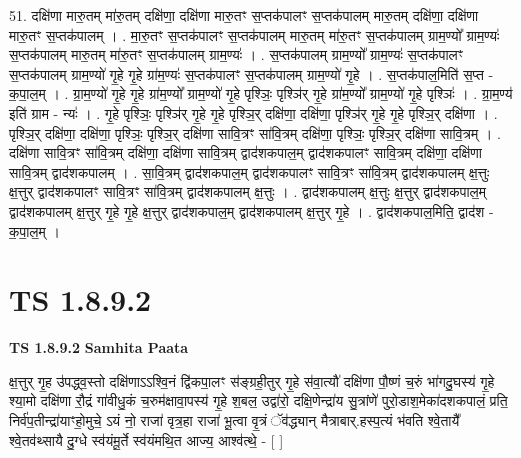\documentclass[17pt]{extarticle}
\begin{document}
51. दक्षि॑णा मारु॒तम् मा॑रु॒तम् दक्षि॑णा॒ दक्षि॑णा मारु॒तꣳ स॒प्तक॑पालꣳ स॒प्तक॑पालम् मारु॒तम् दक्षि॑णा॒ दक्षि॑णा मारु॒तꣳ स॒प्तक॑पालम् । . मा॒रु॒तꣳ स॒प्तक॑पालꣳ स॒प्तक॑पालम् मारु॒तम् मा॑रु॒तꣳ स॒प्तक॑पालम् ग्राम॒ण्यो᳚ ग्राम॒ण्यः॑ स॒प्तक॑पालम् मारु॒तम् मा॑रु॒तꣳ स॒प्तक॑पालम् ग्राम॒ण्यः॑ । . स॒प्तक॑पालम् ग्राम॒ण्यो᳚ ग्राम॒ण्यः॑ स॒प्तक॑पालꣳ स॒प्तक॑पालम् ग्राम॒ण्यो॑ गृ॒हे गृ॒हे ग्रा॑म॒ण्यः॑ स॒प्तक॑पालꣳ स॒प्तक॑पालम् ग्राम॒ण्यो॑ गृ॒हे । . स॒प्तक॑पाल॒मिति॑ स॒प्त - क॒पा॒ल॒म् । . ग्रा॒म॒ण्यो॑ गृ॒हे गृ॒हे ग्रा॑म॒ण्यो᳚ ग्राम॒ण्यो॑ गृ॒हे पृश्ञिः॒ पृश्ञि॑र् गृ॒हे ग्रा॑म॒ण्यो᳚ ग्राम॒ण्यो॑ गृ॒हे पृश्ञिः॑ । . ग्रा॒म॒ण्य॑ इति॑ ग्राम - न्यः॑ । . गृ॒हे पृश्ञिः॒ पृश्ञि॑र् गृ॒हे गृ॒हे पृश्ञि॒र् दक्षि॑णा॒ दक्षि॑णा॒ पृश्ञि॑र् गृ॒हे गृ॒हे पृश्ञि॒र् दक्षि॑णा । . पृश्ञि॒र् दक्षि॑णा॒ दक्षि॑णा॒ पृश्ञिः॒ पृश्ञि॒र् दक्षि॑णा सावि॒त्रꣳ सा॑वि॒त्रम् दक्षि॑णा॒ पृश्ञिः॒ पृश्ञि॒र् दक्षि॑णा सावि॒त्रम् । . दक्षि॑णा सावि॒त्रꣳ सा॑वि॒त्रम् दक्षि॑णा॒ दक्षि॑णा सावि॒त्रम् द्वाद॑शकपाल॒म् द्वाद॑शकपालꣳ सावि॒त्रम् दक्षि॑णा॒ दक्षि॑णा सावि॒त्रम् द्वाद॑शकपालम् । . सा॒वि॒त्रम् द्वाद॑शकपाल॒म् द्वाद॑शकपालꣳ सावि॒त्रꣳ सा॑वि॒त्रम् द्वाद॑शकपालम् क्ष॒त्तुः क्ष॒त्तुर् द्वाद॑शकपालꣳ सावि॒त्रꣳ सा॑वि॒त्रम् द्वाद॑शकपालम् क्ष॒त्तुः । . द्वाद॑शकपालम् क्ष॒त्तुः क्ष॒त्तुर् द्वाद॑शकपाल॒म् द्वाद॑शकपालम् क्ष॒त्तुर् गृ॒हे गृ॒हे क्ष॒त्तुर् द्वाद॑शकपाल॒म् द्वाद॑शकपालम् क्ष॒त्तुर् गृ॒हे । . द्वाद॑शकपाल॒मिति॒ द्वाद॑श - क॒पा॒ल॒म् । \newline
\pagebreak
{}

\section{ TS 1.8.9.2 }

\textbf{TS 1.8.9.2 } \newline
\textbf{Samhita Paata} \newline

क्ष॒त्तुर् गृ॒ह उ॑पद्ध्व॒स्तो दक्षि॑णाऽऽश्वि॒नं द्वि॑कपा॒लꣳ स॑ङ्ग्रही॒तुर् गृ॒हे स॑वा॒त्यौ॑ दक्षि॑णा पौ॒ष्णं च॒रुं भा॑गदु॒घस्य॑ गृ॒हे श्या॒मो दक्षि॑णा रौ॒द्रं गा॑वीधु॒कं च॒रुम॑क्षावा॒पस्य॑ गृ॒हे श॒बल॒ उद्वा॑रो॒ दक्षि॒णेन्द्रा॑य सु॒त्रांणे॑ पुरो॒डाश॒मेका॑दशकपालं॒ प्रति॒ निर्व॑प॒तीन्द्रा॑याꣳहो॒मुचे॒ ऽयं नो॒ राजा॑ वृत्र॒हा राजा॑ भू॒त्वा वृ॒त्रं ॅव॑द्ध्यान् मैत्राबार्.हस्प॒त्यं भ॑वति श्वे॒तायै᳚ श्वे॒तव॑थ्सायै दु॒ग्धे स्व॑यंमू॒र्ते स्व॑यंमथि॒त आज्य॒ आश्व॑त्थे॒ - [ ] \newline
\end{document}
